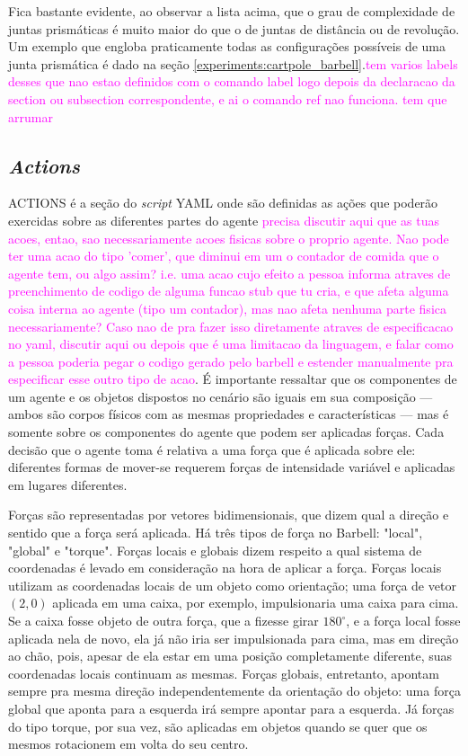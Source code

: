 \documentclass[cic,tc]{iiufrgs}
\newcommand\bruno[1]{\textcolor{magenta}{#1}}
\begin{document}
    Fica bastante evidente, ao observar a lista acima, que o grau de complexidade de juntas prismáticas é muito maior do que o de juntas de distância ou de
    revolução. Um exemplo que engloba praticamente todas as configurações possíveis de uma junta prismática é dado na seção \ref{experiments:cartpole_barbell}.\bruno{tem varios labels desses que nao estao definidos com o comando label logo depois da declaracao da section ou subsection correspondente, e ai o comando ref nao funciona. tem que arrumar}
    
    \subsection{\textit{Actions}}
    ACTIONS é a seção do \textit{script} YAML onde são definidas as ações que poderão exercidas sobre as diferentes partes do agente \bruno{precisa discutir aqui que as tuas acoes, entao, sao necessariamente acoes fisicas sobre o proprio agente. Nao pode ter uma acao do tipo 'comer', que diminui em um o contador de comida que o agente tem, ou algo assim? i.e. uma acao cujo efeito a pessoa informa atraves de preenchimento de codigo de alguma funcao stub que tu cria, e que afeta alguma coisa interna ao agente (tipo um contador), mas nao afeta nenhuma parte fisica necessariamente? Caso nao de pra fazer isso diretamente atraves de especificacao no yaml, discutir aqui ou depois que é uma limitacao da linguagem, e falar como a pessoa poderia pegar o codigo gerado pelo barbell e estender manualmente pra especificar esse outro tipo de acao}. É importante ressaltar que
    os componentes de um agente e os objetos dispostos no cenário são iguais em sua composição --- ambos são corpos físicos com as mesmas propriedades e características ---
    mas é somente sobre os componentes do agente que podem ser aplicadas forças. Cada decisão que o agente toma é relativa a uma força que é aplicada sobre ele:
    diferentes formas de mover-se requerem forças de intensidade variável e aplicadas em lugares diferentes.
    
    
    Forças são representadas por vetores bidimensionais, que dizem qual a direção e sentido que a força será aplicada. Há três tipos de força no Barbell: "local", "global"
    e "torque". Forças locais e globais dizem respeito a qual sistema de coordenadas é levado em consideração na hora de aplicar a força. Forças locais utilizam
    as coordenadas locais de um objeto como orientação; uma força de vetor $(2,0)$ aplicada em uma caixa, por exemplo, impulsionaria uma caixa para cima. Se a caixa
    fosse objeto de outra força, que a fizesse girar $180^\circ$, e a força local fosse aplicada nela de novo, ela já não iria ser impulsionada para cima, mas em
    direção ao chão, pois, apesar de ela estar em uma posição completamente diferente, suas coordenadas locais continuam as mesmas. Forças globais, entretanto,
    apontam sempre pra mesma direção independentemente da orientação do objeto: uma força global que aponta para a esquerda irá sempre apontar para a esquerda.
    Já forças do tipo torque, por sua vez, são aplicadas em objetos quando se quer que os mesmos rotacionem em volta do seu centro.
    
\end{document}
